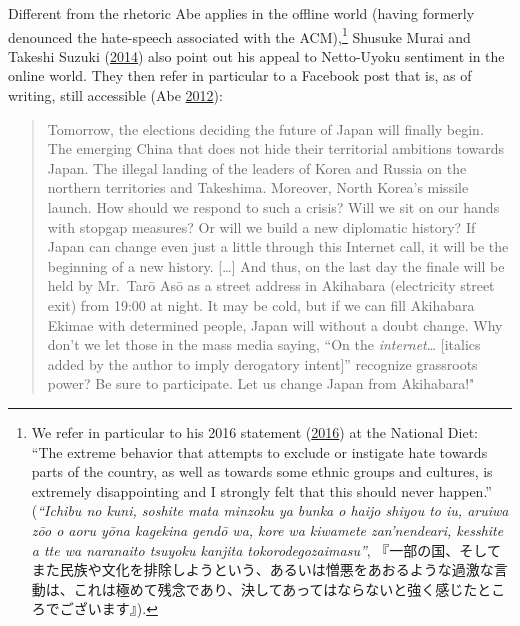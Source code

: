 \documentclass[10pt,british,A4paper,twoside]{memoir}
\begin{document}
Different from the rhetoric Abe applies in the offline world (having
formerly denounced the hate-speech associated with the ACM),\footnote{We
  refer in particular to his 2016 statement
  (\protect\hyperlink{ref-abe_house_2016}{2016}) at the National Diet:
  ``The extreme behavior that attempts to exclude or instigate hate
  towards parts of the country, as well as towards some ethnic groups
  and cultures, is extremely disappointing and I strongly felt that this
  should never happen.'' (\emph{``Ichibu no kuni, soshite mata minzoku ya
  bunka o haijo shiyou to iu, aruiwa zōo o aoru yōna kagekina gendō wa,
  kore wa kiwamete zan'nendeari, kesshite a tte wa naranaito tsuyoku
  kanjita tokorodegozaimasu''},
  『一部の国、そしてまた民族や文化を排除しようという、あるいは憎悪をあおるような過激な言動は、これは極めて残念であり、決してあってはならないと強く感じたところでございます』).}
Shusuke Murai and Takeshi Suzuki
(\protect\hyperlink{ref-hollihan_how_2014}{2014}) also point out his
appeal to Netto-Uyoku sentiment in the online world. They then refer in
particular to a Facebook post that is, as of writing, still accessible
(Abe \protect\hyperlink{ref-abe_1_2012}{2012}):

\begin{quote}
Tomorrow, the elections deciding the future of Japan will finally begin.
The emerging China that does not hide their territorial ambitions
towards Japan. The illegal landing of the leaders of Korea and Russia on
the northern territories and Takeshima. Moreover, North Korea's missile
launch. How should we respond to such a crisis? Will we sit on our hands
with stopgap measures? Or will we build a new diplomatic history? If
Japan can change even just a little through this Internet call, it will
be the beginning of a new history. {[}\ldots{}{]} And thus, on the last
day the finale will be held by Mr.~Tarō Asō as a street address in
Akihabara (electricity street exit) from 19:00 at night. It may be cold,
but if we can fill Akihabara Ekimae with determined people, Japan will
without a doubt change. Why don't we let those in the mass media saying,
``On the \emph{internet}\ldots{} {[}italics added by the author to imply
derogatory intent{]}'' recognize grassroots power? Be sure to
participate. Let us change Japan from Akihabara!"
\end{quote}
\end{document}
